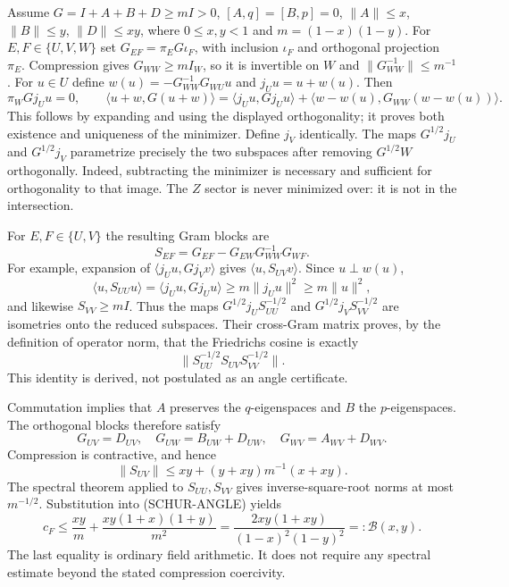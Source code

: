 Assume $G=I+A+B+D\ge mI>0$, $[A,q]=[B,p]=0$,
$\|A\|\le x$, $\|B\|\le y$, $\|D\|\le xy$, where
$0\le x,y<1$ and $m=(1-x)(1-y)$. For $E,F\in\{U,V,W\}$ set
$G_{EF}=\pi_EG\iota_F$, with inclusion $\iota_F$ and orthogonal
projection $\pi_E$. Compression gives $G_{WW}\ge mI_W$, so it is
invertible on $W$ and $\|G_{WW}^{-1}\|\le m^{-1}$.
For $u\in U$ define $w(u)=-G_{WW}^{-1}G_{WU}u$ and $j_Uu=u+w(u)$.
Then
\[
 \pi_WGj_Uu=0,\qquad
 \langle u+w,G(u+w)\rangle
 =\langle j_Uu,Gj_Uu\rangle+
   \langle w-w(u),G_{WW}(w-w(u))\rangle.
\tag{SCHUR-MIN}
\]
This follows by expanding and using the displayed orthogonality; it proves
both existence and uniqueness of the minimizer. Define $j_V$ identically.
The maps $G^{1/2}j_U$ and $G^{1/2}j_V$ parametrize precisely the two
subspaces after removing $G^{1/2}W$ orthogonally. Indeed, subtracting the
minimizer is necessary and sufficient for orthogonality to that image.
The $Z$ sector is never minimized over: it is not in the intersection.

For $E,F\in\{U,V\}$ the resulting Gram blocks are
\[
 S_{EF}=G_{EF}-G_{EW}G_{WW}^{-1}G_{WF}.
\tag{SCHUR-BLOCK}
\]
For example, expansion of $\langle j_Uu,Gj_Vv\rangle$ gives
$\langle u,S_{UV}v\rangle$. Since $u\perp w(u)$,
\[
 \langle u,S_{UU}u\rangle
 =\langle j_Uu,Gj_Uu\rangle\ge m\|j_Uu\|^2\ge m\|u\|^2,
\]
and likewise $S_{VV}\ge mI$. Thus the maps
$G^{1/2}j_US_{UU}^{-1/2}$ and $G^{1/2}j_VS_{VV}^{-1/2}$ are isometries
onto the reduced subspaces. Their cross-Gram matrix proves, by the
definition of operator norm, that the Friedrichs cosine is exactly
\[
 \|S_{UU}^{-1/2}S_{UV}S_{VV}^{-1/2}\|.
\tag{SCHUR-ANGLE}
\]
This identity is derived, not postulated as an angle certificate.

Commutation implies that $A$ preserves the $q$-eigenspaces and $B$ the
$p$-eigenspaces. The orthogonal blocks therefore satisfy
\[
 G_{UV}=D_{UV},\quad G_{UW}=B_{UW}+D_{UW},\quad
 G_{WV}=A_{WV}+D_{WV}.
\]
Compression is contractive, and hence
\[
 \|S_{UV}\|\le xy+(y+xy)m^{-1}(x+xy).
\]
The spectral theorem applied to $S_{UU},S_{VV}$ gives inverse-square-root
norms at most $m^{-1/2}$. Substitution into (SCHUR-ANGLE) yields
\[
 c_F\le\frac{xy}{m}+\frac{xy(1+x)(1+y)}{m^2}
 =\frac{2xy(1+xy)}{(1-x)^2(1-y)^2}=:\mathcal B(x,y).
\tag{SCHUR-FINAL}
\]
The last equality is ordinary field arithmetic. It does not require any
spectral estimate beyond the stated compression coercivity.

